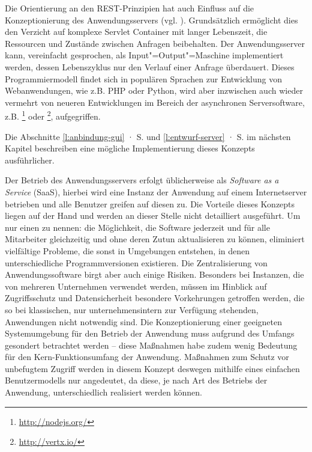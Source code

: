 Die Orientierung an den REST-Prinzipien hat auch Einfluss auf die Konzeptionierung des Anwendungsservers (vgl. \cite[S.127]{rest}). Grundsätzlich ermöglicht dies den Verzicht auf komplexe Servlet Container mit langer Lebenszeit, die Ressourcen und Zustände zwischen Anfragen beibehalten. Der Anwendungsserver kann, vereinfacht gesprochen, als Input"=Output"=Maschine implementiert werden, dessen Lebenszyklus nur den Verlauf einer Anfrage überdauert. Dieses Programmiermodell findet sich in populären Sprachen zur Entwicklung von Webanwendungen, wie z.B. PHP oder Python, wird aber inzwischen auch wieder vermehrt von neueren Entwicklungen im Bereich der asynchronen Serversoftware, z.B. \footnote{\url{http://nodejs.org/}} oder \footnote{\url{http://vertx.io/}}, aufgegriffen.

Die Abschnitte \ref{l:anbindung-gui} · S.\pageref{l:anbindung-gui} und \ref{l:entwurf-server} · S.\pageref{l:entwurf-server} im nächsten Kapitel beschreiben eine mögliche Implementierung dieses Konzepts ausführlicher.

Der Betrieb des Anwendungsservers erfolgt üblicherweise als \emph{Software as a Service} (SaaS), hierbei wird eine Instanz der Anwendung auf einem Internetserver betrieben und alle Benutzer greifen auf diesen zu. Die Vorteile dieses Konzepts liegen auf der Hand und werden an dieser Stelle nicht detailliert ausgeführt. Um nur einen zu nennen: die Möglichkeit, die Software jederzeit und für alle Mitarbeiter gleichzeitig und ohne deren Zutun aktualisieren zu können, eliminiert vielfältige Probleme, die sonst in Umgebungen entstehen, in denen unterschiedliche Programmversionen existieren. Die Zentralisierung von Anwendungssoftware birgt aber auch einige Risiken. Besonders bei Instanzen, die von mehreren Unternehmen verwendet werden, müssen im Hinblick auf Zugriffsschutz und Datensicherheit besondere Vorkehrungen getroffen werden, die so bei klassischen, nur unternehmensintern zur Verfügung stehenden, Anwendungen nicht notwendig sind. Die Konzeptionierung einer geeigneten Systemumgebung für den Betrieb der Anwendung muss aufgrund des Umfangs gesondert betrachtet werden -- diese Maßnahmen habe zudem wenig Bedeutung für den Kern-Funktionsumfang der Anwendung. Maßnahmen zum Schutz vor unbefugtem Zugriff werden in diesem Konzept deswegen mithilfe eines einfachen Benutzermodells nur angedeutet, da diese, je nach Art des Betriebs der Anwendung, unterschiedlich realisiert werden können.

\pagebreak

